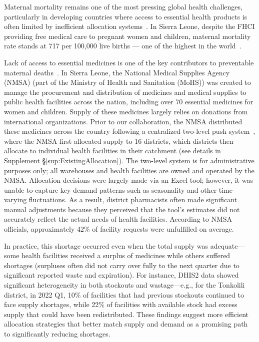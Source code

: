 \documentclass[12pt]{article}
\begin{document}
Maternal mortality remains one of the most pressing global health challenges, particularly in developing countries where access to essential health products is often limited by inefficient allocation systems~\cite{souza2024global}. In Sierra Leone, despite the FHCI providing free medical care to pregnant women and children, maternal mortality rate stands at 717 per 100,000 live births --- one of the highest in the world~\cite{who_maternal_mortality, shafiq2024causes}.

Lack of access to essential medicines is one of the key contributors to preventable maternal deaths~\cite{souza2024global}. In Sierra Leone, the National Medical Supplies Agency (NMSA) (part of the Ministry of Health and Sanitation (MoHS)) was created to manage the procurement and distribution of medicines and medical supplies to public health facilities across the nation, including over 70 essential medicines for women and children. Supply of these medicines largely relies on donations from international organizations. Prior to our collaboration, the NMSA distributed these medicines across the country following a centralized two-level push system~\cite{terwiesch2006matching}, where the NMSA first allocated supply to 16 districts, which districts then allocate to individual health facilities in their catchment (see details in Supplement \S\ref{sup:ExistingAllocation}). The two-level system is for administrative purposes only; all warehouses and health facilities are owned and operated by the NMSA. Allocation decisions were largely made via an Excel tool; however, it was unable to capture key demand patterns such as seasonality and other time-varying fluctuations. As a result, district pharmacists often made significant manual adjustments because they perceived that the tool’s estimates did not accurately reflect the actual needs of health facilities. According to NMSA officials, approximately 42\% of facility requests were unfulfilled on average.


In practice, this shortage occurred even when the total supply was adequate---some health facilities received a surplus of medicines while others suffered shortages (surpluses often did not carry over fully to the next quarter due to significant reported waste and expiration). For instance, DHIS2 data showed significant heterogeneity in both stockouts and wastage---e.g., for the Tonkolili district, in 2022 Q1, 10\% of facilities that had previous stockouts continued to face supply shortages, while 22\% of facilities with available stock had excess supply that could have been redistributed. These findings suggest more efficient allocation strategies that better match supply and demand as a promising path to significantly reducing shortages.
\end{document}
